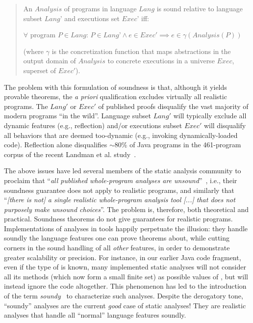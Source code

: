 \begin{quote}
  An \(Analysis\) of programs in language \(Lang\) is sound relative to
  language subset \(Lang’\) and executions set \(Exec’\) iff:
  
  \tab \tab \(\forall\) program \(P \in Lang\): \(P \in Lang’ \land e \in Exec' \implies e \in \gamma(Analysis(P))\)
  
  (where \(\gamma\) is the concretization function that maps abstractions in the output domain of \(Analysis\) to concrete executions in a universe \(Exec\), superset of \(Exec'\)).
\end{quote}

The problem with this formulation of soundness is that, although it
yields provable theorems, the \emph{a priori} qualification
excludes virtually all realistic programs. The \(Lang'\) or \(Exec'\)
of published proofs disqualify the vast majority of modern programs
``in the wild''. Language subset \(Lang'\) will typically exclude all
dynamic features (e.g., reflection) and/or executions subset \(Exec'\)
will disqualify all behaviors that are deemed too-dynamic (e.g.,
invoking dynamically-loaded code).  Reflection alone disqualifies
$\sim$80\% of Java programs in the 461-program corpus of the recent
Landman et al. study~\cite{Landman17}.

The above issues have led several members of
the static analysis community to proclaim that ``\emph{all published
  whole-program analyses are unsound}''~\cite{soundiness15}, i.e.,
their soundness guarantee does not apply to realistic programs, and
similarly that ``\emph{[there is not] a single realistic whole-program
  analysis tool [...] that does not purposely make unsound choices}''.
The problem is, therefore, both theoretical and practical. Soundness
theorems do not give guarantees for realistic
programs. Implementations of analyses in tools happily perpetuate the
illusion: they handle soundly the language features one can prove
theorems about, while cutting corners in the sound handling of all
\emph{other} features, in order to demonstrate greater scalability or
precision. For instance, in our earlier Java code fragment, even if
the type of  is known, many implemented static analyses will
not consider all its methods (which now form a small finite set) as
possible values of , but will instead ignore the code
altogether.  This phenomenon has led to the introduction of the term
\emph{soundy}~\cite{soundiness15} to characterize such analyses.
Despite the derogatory tone, ``soundy'' analyses are the current
\emph{good} case of static analyses! They are realistic analyses that
handle all ``normal'' language features soundly.

